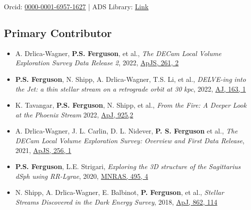 \hspace{1.6in} Orcid: \href{https://orcid.org/0000-0001-6957-1627}{0000-0001-6957-1627} | ADS Library: \href{https://ui.adsabs.harvard.edu/user/libraries/rBhHJF5MTWqIJuR0n-PNKA}{Link}
 

\subsection{Primary Contributor}
\renewcommand{\labelitemi}{$$}
\begin{itemize}[itemsep=1pt]
    \item A. Drlica-Wagner, \textbf{P.S. Ferguson}, et al., \textit{The DECam Local Volume Exploration Survey Data Release 2}, 2022,  \href{https://ui.adsabs.harvard.edu/abs/2022ApJS..261...38D/abstract}{ApJS, 261, 2}
    \item \textbf{P.S. Ferguson}, N. Shipp, A. Drlica-Wagner, T.S. Li, et al., \textit{DELVE-ing into the Jet: a thin stellar stream on a retrograde orbit at 30 kpc}, 2022,  \href{https://ui.adsabs.harvard.edu/abs/2022AJ....163...18F/abstract}{AJ, 163, 1}
    \item K. Tavangar, \textbf{P.S. Ferguson}, N. Shipp, et al., \textit{From the Fire: A Deeper Look at the Phoenix Stream} 2022, \href{https://ui.adsabs.harvard.edu/abs/2021arXiv211003703T}{ApJ, 925,2}
    \item A. Drlica-Wagner, J. L. Carlin, D. L. Nidever, \textbf{P. S. Ferguson} et al., \textit{The DECam Local Volume Exploration Survey: Overview and First Data Release}, 2021, \href{https://ui.adsabs.harvard.edu/abs/2021ApJS..256....2D/abstract}{ApJS, 256, 1} 
    \item \textbf{P.S. Ferguson}, L.E. Strigari, \textit{Exploring the 3D structure of the Sagittarius dSph using RR-Lyrae}, 2020, \href{https://doi.org/10.1093/mnras/staa1404}{MNRAS, 495, 4}
    \item N. Shipp, A. Drlica-Wagner, E. Balbinot, \textbf{P. Ferguson}, et al., \textit{Stellar Streams Discovered in the Dark Energy Survey}, 2018, \href{https://doi.org/10.3847/1538-4357/aacdab}{ApJ, 862, 114}
\end{itemize}

